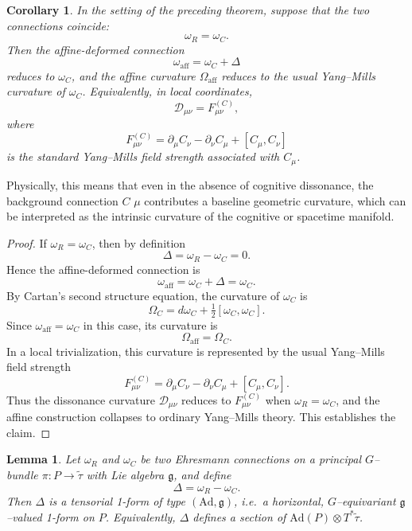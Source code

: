 \documentclass[12pt,openany]{book}
\theoremstyle{plain}
\newtheorem{lemma}{Lemma}[chapter]
\newtheorem{corollary}{Corollary}[chapter]
\theoremstyle{definition}
\theoremstyle{remark}
\begin{document}
\begin{corollary}
In the setting of the preceding theorem, suppose that the two connections
coincide:
\[
\omega_R = \omega_C.
\]
Then the affine-deformed connection
\[
\omega_{\mathrm{aff}} = \omega_C + \Delta
\]
reduces to $\omega_C$, and the affine curvature $\Omega_{\mathrm{aff}}$
reduces to the usual Yang--Mills curvature of $\omega_C$. Equivalently, in
local coordinates,
\[
\mathcal{D}_{\mu\nu} = F_{\mu\nu}^{(C)},
\]
where
\[
F_{\mu\nu}^{(C)}
= \partial_\mu C_\nu - \partial_\nu C_\mu + [C_\mu, C_\nu]
\]
is the standard Yang--Mills field strength associated with $C_\mu$.
\end{corollary}

Physically, this means that even in the absence of cognitive dissonance, the background connection 
$C$
$\mu$
 contributes a baseline geometric curvature, which can be interpreted as the intrinsic curvature of the cognitive or spacetime manifold.

\begin{proof}
If $\omega_R = \omega_C$, then by definition
\[
\Delta = \omega_R - \omega_C = 0.
\]
Hence the affine-deformed connection is
\[
\omega_{\mathrm{aff}} = \omega_C + \Delta = \omega_C.
\]
By Cartan's second structure equation, the curvature of $\omega_C$ is
\[
\Omega_C = d\omega_C + \tfrac{1}{2}[\omega_C,\omega_C].
\]
Since $\omega_{\mathrm{aff}} = \omega_C$ in this case, its curvature is
\[
\Omega_{\mathrm{aff}} = \Omega_C.
\]
In a local trivialization, this curvature is represented by the usual
Yang--Mills field strength
\[
F_{\mu\nu}^{(C)}
= \partial_\mu C_\nu - \partial_\nu C_\mu + [C_\mu, C_\nu].
\]
Thus the dissonance curvature $\mathcal{D}_{\mu\nu}$ reduces to
$F_{\mu\nu}^{(C)}$ when $\omega_R = \omega_C$, and the affine construction
collapses to ordinary Yang--Mills theory. This establishes the claim.
\end{proof}

\begin{lemma}
Let $\omega_R$ and $\omega_C$ be two Ehresmann connections on a principal
$G$--bundle $\pi : P \to \tilde{\tau}$ with Lie algebra $\mathfrak{g}$, and
define
\[
\Delta = \omega_R - \omega_C.
\]
Then $\Delta$ is a tensorial 1-form of type $(\mathrm{Ad},\mathfrak{g})$,
i.e.\ a horizontal, $G$--equivariant $\mathfrak{g}$--valued 1-form on $P$.
Equivalently, $\Delta$ defines a section of $\mathrm{Ad}(P) \otimes T^*\tilde{\tau}$.
\end{lemma}
\end{document}
